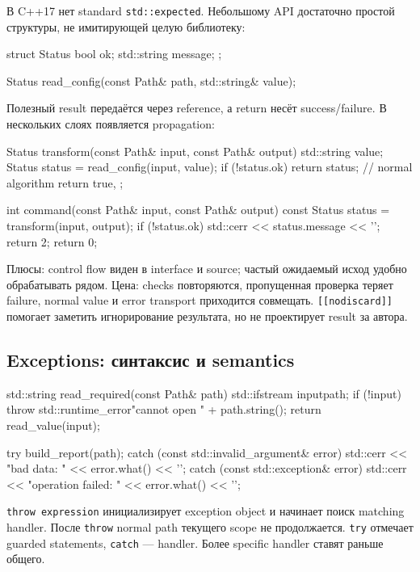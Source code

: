 В C++17 нет standard \texttt{std::expected}. Небольшому API достаточно простой
структуры, не имитирующей целую библиотеку:

\begin{cppcode}
struct Status {
    bool ok;
    std::string message;
};

Status read_config(const Path& path, std::string& value);
\end{cppcode}

Полезный result передаётся через reference, а return несёт success/failure. В
нескольких слоях появляется propagation:

\begin{cppcode}
Status transform(const Path& input, const Path& output) {
    std::string value;
    Status status = read_config(input, value);
    if (!status.ok) return status;
    // normal algorithm
    return {true, {}};
}

int command(const Path& input, const Path& output) {
    const Status status = transform(input, output);
    if (!status.ok) {
        std::cerr << status.message << '\n';
        return 2;
    }
    return 0;
}
\end{cppcode}

Плюсы: control flow виден в interface и source; частый ожидаемый исход удобно
обрабатывать рядом. Цена: checks повторяются, пропущенная проверка теряет failure,
normal value и error transport приходится совмещать. \texttt{[[nodiscard]]}
помогает заметить игнорирование результата, но не проектирует result за автора.

\subsection{Exceptions: синтаксис и semantics}

\begin{cppcode}
std::string read_required(const Path& path) {
    std::ifstream input{path};
    if (!input) {
        throw std::runtime_error{"cannot open " + path.string()};
    }
    return read_value(input);
}

try {
    build_report(path);
} catch (const std::invalid_argument& error) {
    std::cerr << "bad data: " << error.what() << '\n';
} catch (const std::exception& error) {
    std::cerr << "operation failed: " << error.what() << '\n';
}
\end{cppcode}

\texttt{throw expression} инициализирует exception object и начинает поиск
matching handler. После \texttt{throw} normal path текущего scope не продолжается.
\texttt{try} отмечает guarded statements, \texttt{catch} --- handler. Более
specific handler ставят раньше общего.

